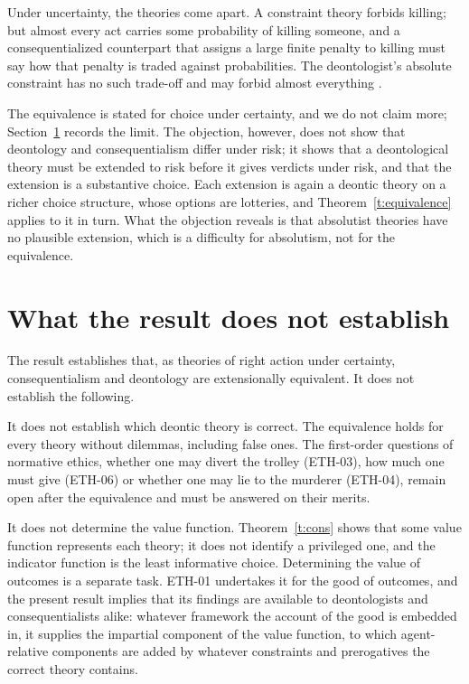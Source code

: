 \documentclass{situationist-preprint}
\begin{document}
\begin{objection}[Risk]
Under uncertainty, the theories come apart. A constraint theory forbids killing; but almost every act carries some probability of killing someone, and a consequentialized counterpart that assigns a large finite penalty to killing must say how that penalty is traded against probabilities. The deontologist's absolute constraint has no such trade-off and may forbid almost everything \citep{JacksonSmith2006}.
\end{objection}

\begin{reply}
The equivalence is stated for choice under certainty, and we do not claim more; Section~\ref{s:notestablished} records the limit. The objection, however, does not show that deontology and consequentialism differ under risk; it shows that a deontological theory must be extended to risk before it gives verdicts under risk, and that the extension is a substantive choice. Each extension is again a deontic theory on a richer choice structure, whose options are lotteries, and Theorem~\ref{t:equivalence} applies to it in turn. What the objection reveals is that absolutist theories have no plausible extension, which is a difficulty for absolutism, not for the equivalence.
\end{reply}

\section{What the result does not establish}\label{s:notestablished}

The result establishes that, as theories of right action under certainty, consequentialism and deontology are extensionally equivalent. It does not establish the following.

It does not establish which deontic theory is correct. The equivalence holds for every theory without dilemmas, including false ones. The first-order questions of normative ethics, whether one may divert the trolley (ETH-03), how much one must give (ETH-06) or whether one may lie to the murderer (ETH-04), remain open after the equivalence and must be answered on their merits.

It does not determine the value function. Theorem~\ref{t:cons} shows that some value function represents each theory; it does not identify a privileged one, and the indicator function is the least informative choice. Determining the value of outcomes is a separate task. ETH-01 undertakes it for the good of outcomes, and the present result implies that its findings are available to deontologists and consequentialists alike: whatever framework the account of the good is embedded in, it supplies the impartial component of the value function, to which agent-relative components are added by whatever constraints and prerogatives the correct theory contains.
\end{document}
